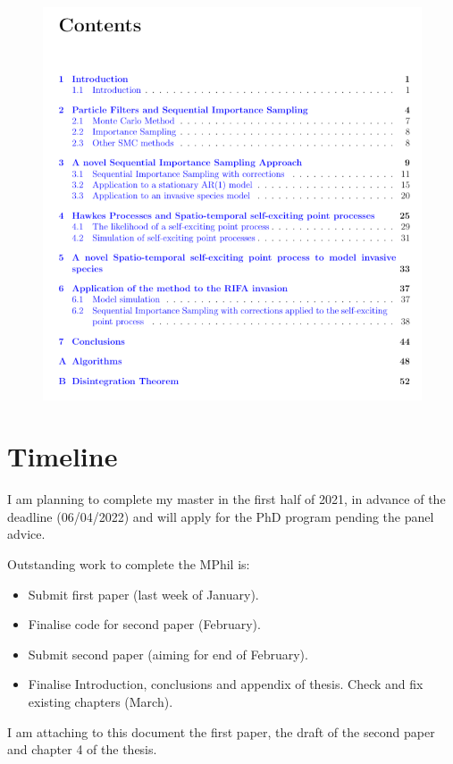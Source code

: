 \documentclass[11pt,a4paper]{article}
\begin{document}
\begin{figure} [h!]
    \includegraphics[scale=1]{Milestones/ContentsThesis.PNG}
\end{figure}

\section{Timeline}

I am planning to complete my master in the first half of 2021, in advance of the deadline (06/04/2022) and will apply for the PhD program pending the panel advice.

Outstanding work to complete the MPhil is:
\begin{itemize}
    \item Submit first paper (last week of January).
    \item Finalise code for second paper (February).
    \item Submit second paper (aiming for end of February).
    \item Finalise Introduction, conclusions and appendix of thesis. Check and fix existing chapters (March).
\end{itemize}

I am attaching to this document the first paper, the draft of the second paper and chapter 4 of the thesis.
\end{document}
